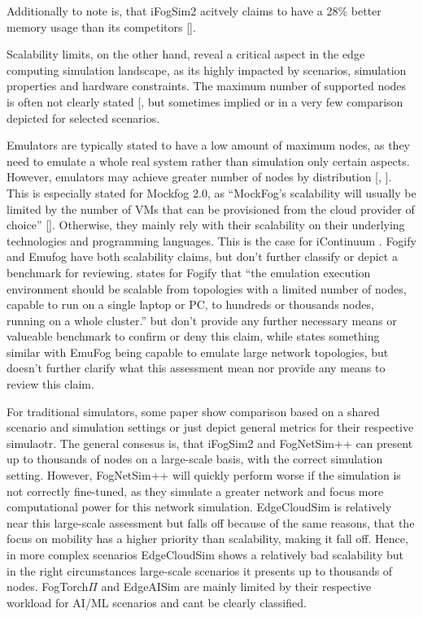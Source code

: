 Additionally to note is, that iFogSim2 acitvely claims to have a 28\% better memory usage than its competitors [\cite{sim-ifogsim2}].

Scalability limits, on the other hand, reveal a critical aspect in the edge computing simulation landscape, as its highly impacted by scenarios, simulation properties and hardware constraints.
The maximum number of supported nodes is often not clearly stated [\cite{qi2025surveyopensourceedgecomputing}, but sometimes implied or in a very few comparison depicted for selected scenarios.

Emulators are typically stated to have a low amount of maximum nodes, as they need to emulate a whole real system rather than simulation only certain aspects.
However, emulators may achieve greater number of nodes by distribution [\cite{qi2025surveyopensourceedgecomputing}, \cite{sim-mockfog2}].
This is especially stated for Mockfog 2.0, as ``MockFog’s scalability will usually be limited by the number of VMs that can be provisioned from the cloud provider of choice'' [\cite{sim-mockfog2}].
Otherwise, they mainly rely with their scalability on their underlying technologies and programming languages. This is the case for iContinuum \cite{sim-icontinuum}.
Fogify and Emufog have both scalability claims, but don't further classify or depict a benchmark for reviewing.
\cite{sim-fogify} states for Fogify that ``the emulation execution environment should be scalable from topologies with a limited number of nodes, capable to run on a single laptop or PC, to hundreds or thousands nodes, running on a whole cluster.'' but don't provide any further necessary
means or valueable benchmark to confirm or deny this claim, while \cite{sim-emufog} states something similar with EmuFog being capable to emulate large network topologies, but doesn't further clarify what this assessment mean nor provide any means to review this claim.

For traditional simulators, some paper show comparison based on a shared scenario and simulation settings or just depict general metrics for their respective simulaotr.
The general consesus is, that iFogSim2 and FogNetSim++ can present up to thousands of nodes on a large-scale basis, with the correct simulation setting.
However, FogNetSim++ will quickly perform worse if the simulation is not correctly fine-tuned, as they simulate a greater network and focus more computational power for this network simulation.
EdgeCloudSim is relatively near this large-scale assessment but falls off because of the same reasons, that the focus on mobility has a higher priority than scalability, making it fall off.
Hence, in more complex scenarios EdgeCloudSim shows a relatively bad scalability but in the right circumstances large-scale scenarios it presents up to thousands of nodes.
FogTorch$\Pi$ and EdgeAISim are mainly limited by their respective workload for AI/ML scenarios and cant be clearly classified.

